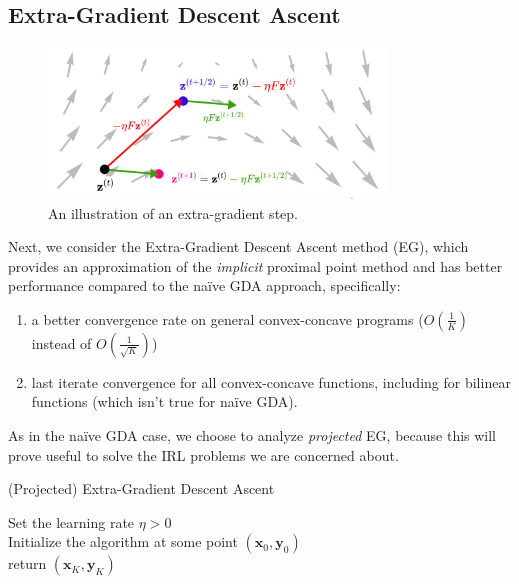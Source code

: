 \subsection{Extra-Gradient Descent Ascent}
\label{sec:extra_grad}
\begin{figure}[h!]
    \centering
    \includegraphics[width=0.8\textwidth]{figures/Extra_Gradient.png}
    \caption{An illustration of an extra-gradient step.}
\end{figure}
Next, we consider the Extra-Gradient Descent Ascent method (EG), which provides an approximation of the \textit{implicit} proximal point method and has better performance compared to the naïve GDA approach, specifically:
\begin{enumerate}
    \item a better convergence rate on general convex-concave programs ($O(\frac{1}{K})$ instead of $O(\frac{1}{\sqrt{K}})$)
    \item last iterate convergence for all convex-concave functions, including for bilinear functions (which isn't true for naïve GDA).
\end{enumerate}

As in the naïve GDA case, we choose to analyze \textit{projected} EG, because this will prove useful to solve the IRL problems we are concerned about.

\begin{algorithm}[H]
    \label{alg:projEG}
    \SetAlgoLined
    \caption{(Projected) Extra-Gradient Descent Ascent}
    Set the learning rate $\eta >0$ \\
    Initialize the algorithm at some point $(\bm{x}_0,\bm{y}_0)$  \\
    return $(\bm{x}_K,\bm{y}_K)$
\end{algorithm}

